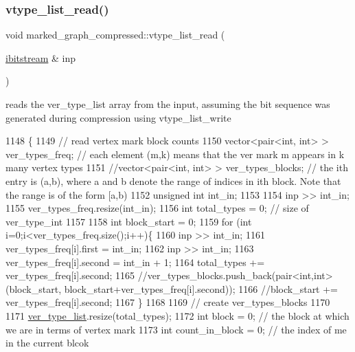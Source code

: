 \subsubsection{\texorpdfstring{vtype\+\_\+list\+\_\+read()}{vtype\_list\_read()}}
{\footnotesize\ttfamily void marked\+\_\+graph\+\_\+compressed\+::vtype\+\_\+list\+\_\+read (\begin{DoxyParamCaption}\item[{\hyperlink{classibitstream}{ibitstream} \&}]{inp }\end{DoxyParamCaption})}



reads the ver\+\_\+type\+\_\+list array from the input, assuming the bit sequence was generated during compression using vtype\+\_\+list\+\_\+write 


\begin{DoxyCode}
1148                                                             \{
1149   \textcolor{comment}{// read vertex mark block counts}
1150   vector<pair<int, int> > ver\_types\_freq; \textcolor{comment}{// each element (m,k) means that the ver mark m appears in k many
       vertex types}
1151   \textcolor{comment}{//vector<pair<int, int> > ver\_types\_blocks; // the ith entry is (a,b), where a and b denote the range of
       indices in ith block. Note that the range is of the form [a,b)}
1152   \textcolor{keywordtype}{unsigned} \textcolor{keywordtype}{int} int\_in;
1153 
1154   inp >> int\_in;
1155   ver\_types\_freq.resize(int\_in);
1156   \textcolor{keywordtype}{int} total\_types = 0; \textcolor{comment}{// size of ver\_type\_int}
1157 
1158   \textcolor{keywordtype}{int} block\_start = 0;
1159   \textcolor{keywordflow}{for} (\textcolor{keywordtype}{int} i=0;i<ver\_types\_freq.size();i++)\{
1160     inp >> int\_in;
1161     ver\_types\_freq[i].first = int\_in;
1162     inp >> int\_in;
1163     ver\_types\_freq[i].second  = int\_in + 1;
1164     total\_types += ver\_types\_freq[i].second;
1165     \textcolor{comment}{//ver\_types\_blocks.push\_back(pair<int,int>(block\_start, block\_start+ver\_types\_freq[i].second));}
1166     \textcolor{comment}{//block\_start += ver\_types\_freq[i].second;}
1167   \}
1168 
1169   \textcolor{comment}{// create ver\_types\_blocks}
1170 
1171   \hyperlink{classmarked__graph__compressed_af2e3e55223d436628a02758dfae88493}{ver\_type\_list}.resize(total\_types);
1172   \textcolor{keywordtype}{int} block = 0; \textcolor{comment}{// the block at which we are in terms of vertex mark}
1173   \textcolor{keywordtype}{int} count\_in\_block = 0; \textcolor{comment}{// the index of me in the current blcok}

\end{DoxyCode}
